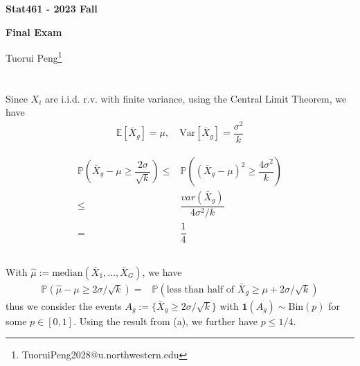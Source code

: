 \documentclass[11pt,a4paper]{article}
\numberwithin{equation}{section}%
\begin{document}
\begin{center}\thispagestyle{plain}

{\LARGE\textbf{Stat461 - 2023 Fall}}

{\Large\textbf{Final Exam}}

Tuorui Peng\footnote{TuoruiPeng2028@u.northwestern.edu}
\end{center}

\thispagestyle{myheadings}
\pagestyle{myheadings}





  


\section{}

\subsection{}

Since $ X_i $ are i.i.d. r.v. with finite variance, using the Central Limit Theorem, we have
\begin{align*}
    \mathbb{E}\left[ \bar{X} _g\right] = \mu, \quad \text{Var}\left[ \bar{X} _g\right] = \dfrac{ \sigma ^2 }{ k }  
\end{align*}


\begin{align*}
    \mathbb{P}\left( \bar{X}_g -\mu \geq \dfrac{ 2\sigma  }{ \sqrt{k} }  \right) \leq & \mathbb{P}\left( (\bar{X}_g -\mu)^2 \geq \dfrac{ 4\sigma ^2 }{ k }  \right)   \\
    \leq & \dfrac{ var(\bar{X}_g) }{ 4\sigma ^2/k }\\
    =& \dfrac{ 1 }{ 4 }  
\end{align*}

\subsection{}
With $ \hat{\mu }:= \mathrm{ median }(\bar{X}_1,\ldots,\bar{X}_G)  $, we have
\begin{align*}
    \mathbb{P}\left( \hat{\mu }-\mu \geq 2\sigma /\sqrt{k} \right) =& \mathbb{P}\left( \text{less than half of }\bar{X}_g \geq \mu +2\sigma /\sqrt{k} \right) 
\end{align*}
thus we consider the events $ A_g:= \{\bar{X}_g \geq 2\sigma /\sqrt{k}\} $ with $ \mathbf{1}(A_g) \sim \mathrm{Bin}(p) $ for some $ p\in[0,1] $. Using the result from (a), we further have $ p\leq 1/4 $.
\end{document}
